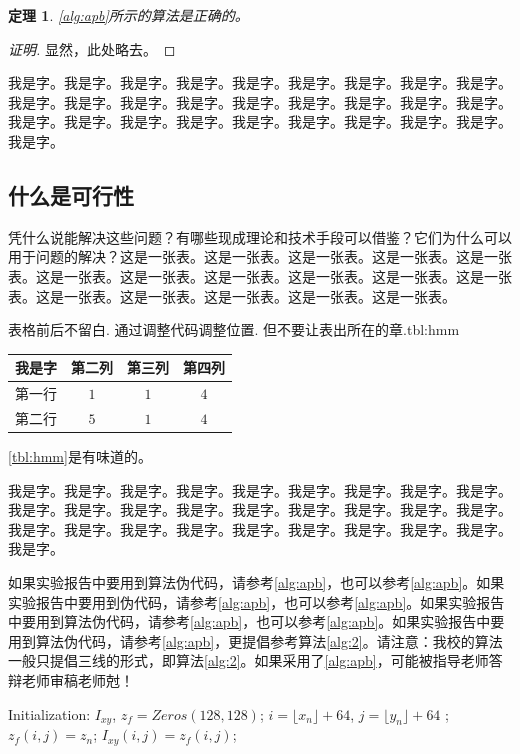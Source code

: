 \documentclass[supercite]{HustGraduPaper}
\newcommand{\ralg}[1]{\autoref{alg:#1}}
\newcommand{\rtbl}[1]{\autoref{tbl:#1}}
\newtheorem{thm}{定理}[section]
\theoremstyle{definition}
\begin{document}
\begin{thm} \label{thm:gsb-apprx}
  \ralg{apb}所示的算法是正确的。
\end{thm}
\begin{proof}[证明]
  显然，此处略去。
\end{proof}

我是字。我是字。我是字。我是字。我是字。我是字。我是字。我是字。我是字。我是字。我是字。我是字。我是字。我是字。我是字。我是字。我是字。我是字。我是字。我是字。我是字。我是字。我是字。我是字。我是字。我是字。我是字。我是字。

\subsection{什么是可行性}

凭什么说能解决这些问题\cite{MIH2010IEEE}？有哪些现成理论和技术手段可以借鉴？它们为什么可以用于问题的解决？这是一张表。这是一张表。这是一张表。这是一张表。这是一张表。这是一张表。这是一张表。这是一张表。这是一张表。这是一张表。这是一张表。这是一张表。这是一张表。这是一张表。这是一张表。这是一张表。

\begin{generaltab}{表格前后不留白. 通过调整代码调整位置. 但不要让表出所在的章.}{tbl:hmm}
  \begin{tabular}{c|ccc}
    \toprule
    我是字 & 第二列 & 第三列 & 第四列 \\
    \midrule
    第一行 & $1$ & $1$ & $4$ \\
    第二行 & $5$ & $1$ & $4$ \\
    \bottomrule
  \end{tabular}
\end{generaltab}

\rtbl{hmm}是有味道的。

我是字。我是字。我是字。我是字。我是字。我是字。我是字。我是字。我是字。我是字。我是字。我是字。我是字。我是字。我是字。我是字。我是字。我是字。我是字。我是字。我是字。我是字。我是字。我是字。我是字。我是字。我是字。我是字。

如果实验报告中要用到算法伪代码，请参考\ralg{apb}，也可以参考\ralg{apb}。如果实验报告中要用到伪代码，请参考\ralg{apb}，也可以参考\ralg{apb}。如果实验报告中要用到算法伪代码，请参考\ralg{apb}，也可以参考\ralg{apb}。如果实验报告中要用到算法伪代码，请参考\ralg{apb}，更提倡参考算法\ref{alg:2}。请注意：我校的算法一般只提倡三线的形式，即算法\ref{alg:2}。如果采用了\ralg{apb}，可能被指导老师答辩老师审稿老师尅！

\begin{algorithm}[h] 
	\caption{一个更复杂算法}
	\begin{algorithmic}[1]
		\State Initialization: $I_{xy}$, $z_{f}=Zeros(128, 128)$; 
		\State $i=\lfloor x_n \rfloor+64$, $j=\lfloor y_n \rfloor + 64$
		;
		\State $z_{f}(i,j)=z_n$;
		\EndIf
		\State $I_{xy}(i,j)=z_{f}(i,j)$;
		\EndFor 
	\end{algorithmic}\label{alg:2}
\end{algorithm}
\end{document}
